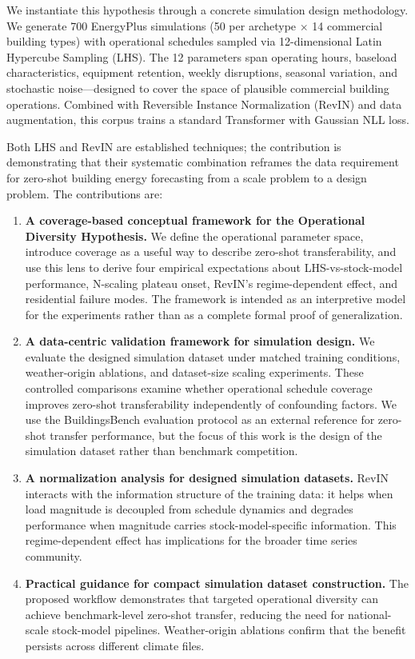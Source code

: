 \documentclass[preprint,12pt,authoryear]{elsarticle}
\begin{document}
We instantiate this hypothesis through a concrete simulation design methodology. We generate 700 EnergyPlus simulations (50 per archetype $\times$ 14 commercial building types) with operational schedules sampled via 12-dimensional Latin Hypercube Sampling (LHS). The 12 parameters span operating hours, baseload characteristics, equipment retention, weekly disruptions, seasonal variation, and stochastic noise---designed to cover the space of plausible commercial building operations. Combined with Reversible Instance Normalization (RevIN) \citep{Kim2022} and data augmentation, this corpus trains a standard Transformer with Gaussian NLL loss.

Both LHS and RevIN are established techniques; the contribution is demonstrating that their systematic combination reframes the data requirement for zero-shot building energy forecasting from a scale problem to a design problem. The contributions are:

\begin{enumerate}
\item \textbf{A coverage-based conceptual framework for the Operational Diversity Hypothesis.} We define the operational parameter space, introduce coverage as a useful way to describe zero-shot transferability, and use this lens to derive four empirical expectations about LHS-vs-stock-model performance, N-scaling plateau onset, RevIN's regime-dependent effect, and residential failure modes. The framework is intended as an interpretive model for the experiments rather than as a complete formal proof of generalization.

\item \textbf{A data-centric validation framework for simulation design.} We evaluate the designed simulation dataset under matched training conditions, weather-origin ablations, and dataset-size scaling experiments. These controlled comparisons examine whether operational schedule coverage improves zero-shot transferability independently of confounding factors. We use the BuildingsBench evaluation protocol \citep{Emami2023} as an external reference for zero-shot transfer performance, but the focus of this work is the design of the simulation dataset rather than benchmark competition.

\item \textbf{A normalization analysis for designed simulation datasets.} RevIN interacts with the information structure of the training data: it helps when load magnitude is decoupled from schedule dynamics and degrades performance when magnitude carries stock-model-specific information. This regime-dependent effect has implications for the broader time series community.

\item \textbf{Practical guidance for compact simulation dataset construction.} The proposed workflow demonstrates that targeted operational diversity can achieve benchmark-level zero-shot transfer, reducing the need for national-scale stock-model pipelines. Weather-origin ablations confirm that the benefit persists across different climate files.
\end{enumerate}
\end{document}
